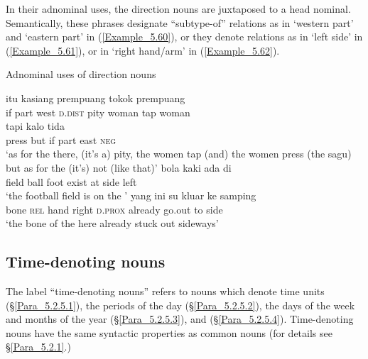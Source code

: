 In their adnominal uses, the direction nouns are juxtaposed to a head nominal. Semantically, these  phrases designate ``subtype-of'' relations as in  ‘western part’ and  ‘eastern part’ in (\ref{Example_5.60}), or they denote  relations as in  ‘left side’ in (\ref{Example_5.61}), or in  ‘right hand/arm’ in (\ref{Example_5.62}).


\begin{styleExampleTitle}
Adnominal uses of direction nouns
\end{styleExampleTitle}
\ea
\label{Example_5.60}
 {{}} {{}} {{itu}} {{kasiang}} {prempuang} {tokok} {prempuang}\\ %
 if  {part}  {west}  {\textsc{d.dist}}  {pity}  woman  tap  woman\\
  tapi  {kalo}  {}  {}  {tida}\\
 {press}  but  {if}  {part}  {east}  {\textsc{neg}}\\
 ‘as for the  there, (it’s a) pity, the women tap (and) the women press (the sagu) but as for the  (it’s) not (like that)’ \textstyleExampleSource{[081014-007-CvEx.0025-0026]}
\z
\ea
\label{Example_5.61}
 {bola} {kaki} {ada} {di} {} {}\\ %
 field  ball  foot  exist  at  side  left\\
\glt 
‘the football field is on the ’ \textstyleExampleSource{[Elicited BR130103.011]}
\z
\ea
\label{Example_5.62}
 {yang} {} {} {ini} {su} {kluar} {ke} {samping}\\ %
 bone  \textsc{rel}  hand  right  \textsc{d.prox}  already  go.out  to  side\\
 ‘the bone of the  here already stuck out sideways’ \textstyleExampleSource{[081108-003-JR.0006]}
\z


\subsection{Time-denoting nouns}
\label{Para_5.2.5}
The label ``time-denoting nouns'' refers to nouns which denote time units (§\ref{Para_5.2.5.1}), the periods of the day (§\ref{Para_5.2.5.2}), the days of the week and months of the year (§\ref{Para_5.2.5.3}), and  (§\ref{Para_5.2.5.4}). Time-denoting nouns have the same syntactic properties as common nouns (for details see §\ref{Para_5.2.1}.)


